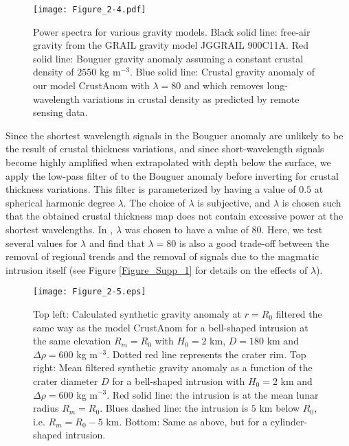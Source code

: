 \begin{figure}[h!]
  \graphicspath{ {/Users/thorey/Documents/These/Projet/FFC/Gravi_GRAIL/Article/Papier/Proof/} }
  \begin{center}
    \texttt{[image: Figure\_2-4.pdf]}
    \caption{Power spectra  for various  gravity models.   Black solid
      line:  free-air gravity  from  the GRAIL  gravity model  JGGRAIL
      900C11A.   Red solid  line: Bouguer  gravity anomaly  assuming a
      constant  crustal density  of  $2550$ kg  m$^{-3}$.  Blue  solid
      line:  Crustal  gravity  anomaly  of our  model  CrustAnom  with
      $\lambda=80$  and which  removes  long-wavelength variations  in
      crustal density as predicted by remote sensing data.}
    \label{C6-Figure2-4}
  \end{center}
\end{figure}

Since  the shortest  wavelength  signals in  the  Bouguer anomaly  are
unlikely to be  the result of crustal thickness  variations, and since
short-wavelength  signals become  highly  amplified when  extrapolated
with  depth  below  the  surface,  we apply  the  low-pass  filter  of
\citet{wieczorek:1998th} to  the Bouguer anomaly before  inverting for
crustal thickness variations.  This  filter is parameterized by having
a value of $0.5$ at spherical harmonic degree $\lambda$. The choice of
$\lambda$  is  subjective,  and  $\lambda$ is  chosen  such  that  the
obtained crustal thickness map does not contain excessive power at the
shortest  wavelengths.   In \citet{Wieczorek:2013ipa},  $\lambda$  was
chosen to  have a  value of  $80$.  Here, we  test several  values for
$\lambda$ and find that $\lambda=80$  is also a good trade-off between
the removal of  regional trends and the removal of  signals due to the
magmatic intrusion itself (see  Figure \ref{Figure_Supp_1} for details
on the effects of $\lambda$).

\begin{figure}[h!]
  \graphicspath{ {/Users/thorey/Documents/These/Projet/FFC/Gravi_GRAIL/Article/Papier/Proof/} }
  \begin{center}
    \texttt{[image: Figure\_2-5.eps]}
    \caption{Top left: Calculated synthetic gravity anomaly at $r=R_0$
      filtered the same  way as the model CrustAnom  for a bell-shaped
      intrusion at the  same elevation $R_m = R_0$ with  $H_0 = 2$ km,
      $D =  180$ km and $\Delta  \rho = 600$ kg  m$^{-3}$.  Dotted red
      line  represents  the  crater  rim.  Top  right:  Mean  filtered
      synthetic gravity anomaly  as a function of  the crater diameter
      $D$  for  a  bell-shaped  intrusion   with  $H_0  =  2$  km  and
      $\Delta \rho = 600$ kg  m$^{-3}$.  Red solid line: the intrusion
      is at  the mean lunar  radius $R_m=R_0$. Blues dashed  line: the
      intrusion is  $5$ km below  $R_0$, i.e. $R_m=R_0-5$  km. Bottom:
      Same as above, but for a cylinder-shaped intrusion.}
    \label{C6-Figure2-5}
  \end{center}
\end{figure}

